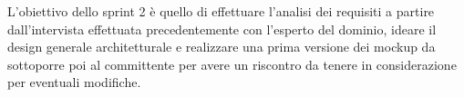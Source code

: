 L'obiettivo dello sprint 2 è quello di effettuare l'analisi dei requisiti a partire dall'intervista effettuata precedentemente con l'esperto del dominio, ideare il design generale architetturale e realizzare una prima versione dei mockup da sottoporre poi al committente per avere un riscontro da tenere in considerazione per eventuali modifiche.
